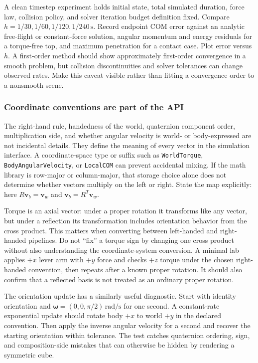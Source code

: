 A clean timestep experiment holds initial state, total simulated duration, force law, collision policy, and solver iteration budget definition fixed. Compare \(h=1/30,1/60,1/120,1/240\,\mathrm s\). Record endpoint COM error against an analytic free-flight or constant-force solution, angular momentum and energy residuals for a torque-free top, and maximum penetration for a contact case. Plot error versus \(h\). A first-order method should show approximately first-order convergence in a smooth problem, but collision discontinuities and solver tolerances can change observed rates. Make this caveat visible rather than fitting a convergence order to a nonsmooth scene.

\subsubsection{Coordinate conventions are part of the API}\label{06-engine-ii-ch034-coordinate-conventions-are-part-of-the-api}

The right-hand rule, handedness of the world, quaternion component order, multiplication side, and whether angular velocity is world- or body-expressed are not incidental details. They define the meaning of every vector in the simulation interface. A coordinate-space type or suffix such as \texttt{WorldTorque}, \texttt{BodyAngularVelocity}, or \texttt{LocalCOM} can prevent accidental mixing. If the math library is row-major or column-major, that storage choice alone does not determine whether vectors multiply on the left or right. State the map explicitly: here \(R\mathbf v_b=\mathbf v_w\) and \(\mathbf v_b=R^T\mathbf v_w\).

Torque is an axial vector: under a proper rotation it transforms like any vector, but under a reflection its transformation includes orientation behavior from the cross product. This matters when converting between left-handed and right-handed pipelines. Do not ``fix'' a torque sign by changing one cross product without also understanding the coordinate-system conversion. A minimal lab applies \(+x\) lever arm with \(+y\) force and checks \(+z\) torque under the chosen right-handed convention, then repeats after a known proper rotation. It should also confirm that a reflected basis is not treated as an ordinary proper rotation.

The orientation update has a similarly useful diagnostic. Start with identity orientation and \(\boldsymbol\omega=(0,0,\pi/2)\,\mathrm{rad/s}\) for one second. A constant-rate exponential update should rotate body \(+x\) to world \(+y\) in the declared convention. Then apply the inverse angular velocity for a second and recover the starting orientation within tolerance. The test catches quaternion ordering, sign, and composition-side mistakes that can otherwise be hidden by rendering a symmetric cube.

